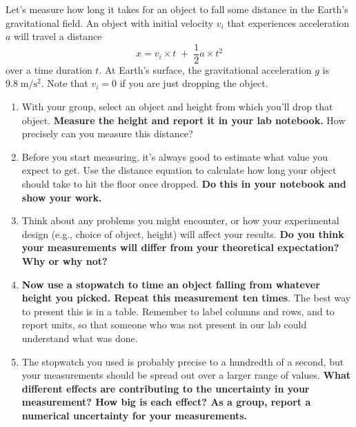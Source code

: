 \documentclass[11pt]{article}%
\newcommand{\SPACE}{\vspace{6em}}
\newcommand*{\unit}[1]{\;\mathrm{#1}}  %
\begin{document}
Let's measure how long it takes for an object to fall some distance in the Earth's gravitational field.
An object with initial velocity $v_i$ that experiences acceleration $a$ will travel a distance
\begin{equation}
x=v_i \times t \; + \; \frac{1}{2}a \times t^2
\end{equation}
over a time duration $t$. At Earth's surface, the gravitational acceleration $g$ is $9.8 \unit{m/s^2}$. Note that $v_i = 0$ if you are just dropping the object.

\begin{enumerate}

\item With your group, select an object and height from which you'll drop that object. \textbf{Measure the height and report it in your lab notebook.} How precisely can you measure this distance?
\SPACE

\item Before you start measuring, it's always good to estimate what value you expect to get. Use the distance equation to calculate how long your object should take to hit the floor once dropped. \textbf{Do this in your notebook and show your work.}
\SPACE

\item Think about any problems you might encounter, or how your experimental design (e.g., choice of object, height) will affect your results. \textbf{Do you think your measurements will differ from your theoretical expectation? Why or why not?}
\SPACE

\item {\bf Now use a stopwatch to time an object falling from whatever height you picked. Repeat this measurement ten times}. The best way to present this is in a table. Remember to label columns and rows, and to report units, so that someone who was not present in our lab could understand what was done.
\SPACE
\SPACE
\SPACE

\item The stopwatch you used is probably precise to a hundredth of a second, but your measurements should be spread out over a larger range of values. \textbf{What different effects are contributing to the uncertainty in your measurement? How big is each effect? As a group, report a numerical uncertainty for your measurements.} %
\SPACE
\SPACE



\end{enumerate}
\end{document}

